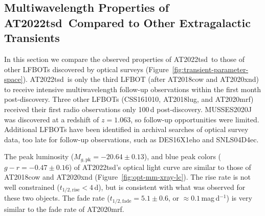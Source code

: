 \documentclass{nature_plusfigure}
\newcommand{\at}{AT2022tsd}
\begin{document}
\begin{methods}
\section{Multiwavelength Properties of \at\ Compared to Other Extragalactic Transients}
\label{sec:multiwavelength-properties}

In this section we compare the observed properties of \at\ to those of other LFBOTs discovered by optical surveys (Figure~\ref{fig:transient-parameter-space}).
\at\ is only the third LFBOT (after AT2018cow\cite{Prentice2018,Perley2019} and AT2020xnd\cite{Perley2021}) to receive intensive multiwavelength follow-up observations within the first month post-discovery.
Three other LFBOTs (CSS161010\cite{Coppejans2020}, AT2018lug\cite{Ho2020_Koala}, and AT2020mrf\cite{Yao2022}) received their first radio observations only 100\,d post-discovery. MUSSES2020J\cite{Jiang2022} was discovered at a redshift of $z=1.063$, so follow-up opportunities were limited.
Additional LFBOTs have been identified in archival searches of optical survey data, too late for follow-up observations, such as DES16X1eho\cite{Pursiainen2018} and SNLS04D4ec\cite{Arcavi2016}. 

The peak luminosity ($M_{g,\mathrm{pk}}=-20.64\pm0.13$), and blue peak colors ($g-r=-0.47\pm0.16$) of \at's optical light curve are similar to those of AT2018cow\cite{Prentice2018,Perley2019} and AT2020xnd\cite{Perley2021} (Figure~\ref{fig:opt-mm-xray-lc}).
The rise rate is not well constrained ($t_{1/2,\mathrm{rise}}<4\,$d), but is consistent with what was observed for these two objects.
The fade rate ($t_{1/2,\mathrm{fade}}=5.1\pm0.6$, or $\approx0.1\,$mag\,d$^{-1}$) is very similar to the fade rate of AT2020mrf\cite{Yao2022}.



\end{methods}
\end{document}

